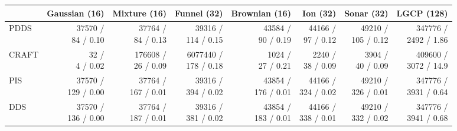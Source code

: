 \documentclass{article}
\theoremstyle{plain}
\theoremstyle{definition}
\theoremstyle{remark}
\begin{document}
\begin{table}[]
	\centering
	\def\arraystretch{2.0}
	\begin{tabular}{lrrrrrrr}
		\toprule
		      & Gaussian (16)     & Mixture (16) & Funnel (32)  & Brownian (16) & Ion (32)     & Sonar (32)   & LGCP (128)   \\
		\midrule
		PDDS  & \makecell{37570 /                                                                                            \\84 / 0.10} & \makecell{37764 /\\84 / 0.13} & \makecell{39316 /\\114 / 0.15} & \makecell{43584 /\\90 / 0.19} & \makecell{44166 /\\97 / 0.12} & \makecell{49210 /\\105 / 0.12} & \makecell{347776 /\\2492 / 1.86} \\
		CRAFT & \makecell{32 /                                                                                               \\4 / 0.02} & \makecell{176608 /\\26 / 0.09} & \makecell{6077440 /\\178 / 0.18} & \makecell{1024 /\\27 / 0.21} & \makecell{2240 /\\38 / 0.09} & \makecell{3904 /\\40 / 0.09} & \makecell{409600 /\\3072 / 14.9} \\
		PIS   & \makecell{37570 /                                                                                            \\129 / 0.00} & \makecell{37764 /\\167 / 0.01} & \makecell{39316 /\\394 / 0.02} & \makecell{43854 /\\176 / 0.01} & \makecell{44166 /\\324 / 0.02} & \makecell{49210 /\\326 / 0.01} & \makecell{347776 /\\3931 / 0.64} \\
		DDS   & \makecell{37570 /                                                                                            \\136 / 0.00} & \makecell{37764 /\\187 / 0.01} & \makecell{39316 /\\381 / 0.02} & \makecell{43854 /\\183 / 0.01}  & \makecell{44166 /\\338 / 0.01} & \makecell{49210 /\\332 / 0.02} & \makecell{347776 /\\3941 / 0.68} \\

\end{tabular}
\end{table}
\end{document}
